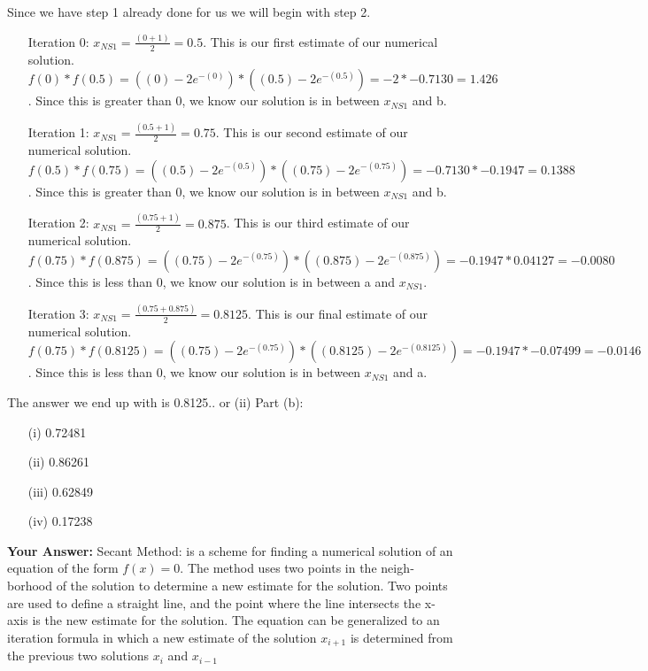 \documentclass[12pt]{report}
\begin{document}
Since we have step 1 already done for us we will begin with step 2.
\begin{itemize}
\item[Iteration 0:] $x_{NS1} = \frac{(0+1)}{2} = 0.5$. This is our first estimate of our numerical solution. $f(0) * f(0.5) = ((0) - 2e^{-(0)}) * ((0.5) - 2e^{-(0.5)}) = -2 * -0.7130 = 1.426$. Since this is greater than 0, we know our solution is in between $x_{NS1}$ and b.
\item[Iteration 1:] $x_{NS1} = \frac{(0.5+1)}{2} = 0.75$. This is our second estimate of our numerical solution. $f(0.5) * f(0.75) = ((0.5) - 2e^{-(0.5)}) * ((0.75) - 2e^{-(0.75)}) = -0.7130 * -0.1947 = 0.1388$. Since this is greater than 0, we know our solution is in between $x_{NS1}$ and b.
\item[Iteration 2:] $x_{NS1} = \frac{(0.75+1)}{2} = 0.875$. This is our third estimate of our numerical solution. $f(0.75) * f(0.875) = ((0.75) - 2e^{-(0.75)}) * ((0.875) - 2e^{-(0.875)}) = -0.1947 * 0.04127 = -0.0080$. Since this is less than 0, we know our solution is in between a and $x_{NS1}$.
\item[Iteration 3:] $x_{NS1} = \frac{(0.75+0.875)}{2} = 0.8125$. This is our final estimate of our numerical solution. $f(0.75) * f(0.8125) = ((0.75) - 2e^{-(0.75)}) * ((0.8125) - 2e^{-(0.8125)}) = -0.1947 * -0.07499 = -0.0146$. Since this is less than 0, we know our solution is in between $x_{NS1}$ and a.
\end{itemize}
The answer we end up with is 0.8125.. or (ii)
\newline
\newline
Part (b):
\begin{itemize}
\item[(i)] 0.72481
\item[(ii)] 0.86261
\item[(iii)] 0.62849
\item[(iv)] 0.17238
\end{itemize}
\textbf{Your Answer:}
\newline
Secant Method: is a scheme for finding a  numerical solution of an equation of the form $f(x) = 0$. The method uses two points in the neigh­borhood of the solution to  determine a new estimate for the solution. Two points are used to define a straight line, and the point where the line intersects the x-axis is the new estimate for the solution. 
\newline
The equation can be generalized to an iteration formula in which a new estimate of the solution $x_{i+1}$ is determined from the previous two solutions $x_i$ and $x_{i-1}$
\end{document}
